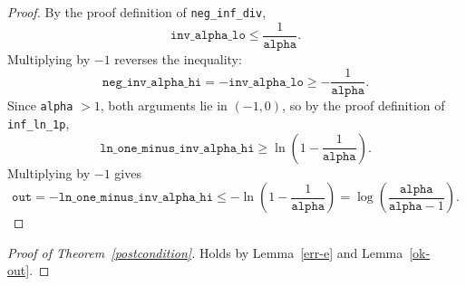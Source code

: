 \documentclass{article}
\begin{document}
\begin{proof}
By the proof definition of \texttt{neg\_inf\_div},
\[
\texttt{inv\_alpha\_lo} \le \frac{1}{\texttt{alpha}}.
\]
Multiplying by $-1$ reverses the inequality:
\[
\texttt{neg\_inv\_alpha\_hi} = -\texttt{inv\_alpha\_lo} \ge -\frac{1}{\texttt{alpha}}.
\]
Since \texttt{alpha} $> 1$, both arguments lie in $(-1,0)$, so by the proof definition of
\texttt{inf\_ln\_1p},
\[
\texttt{ln\_one\_minus\_inv\_alpha\_hi}
\ge \ln\!\left(1 - \frac{1}{\texttt{alpha}}\right).
\]
Multiplying by $-1$ gives
\[
\texttt{out}
=
-\texttt{ln\_one\_minus\_inv\_alpha\_hi}
\le
-\ln\!\left(1 - \frac{1}{\texttt{alpha}}\right)
= \log\!\left(\frac{\texttt{alpha}}{\texttt{alpha} - 1}\right).
\]
\end{proof}

\begin{proof}[Proof of Theorem~\ref{postcondition}]
Holds by Lemma~\ref{err-e} and Lemma~\ref{ok-out}.
\end{proof}
\end{document}

